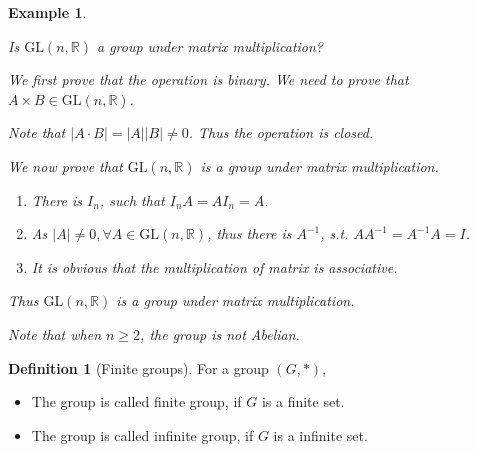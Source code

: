 \documentclass{article}
\theoremstyle{MyNonumberplain}
\theoremstyle{break}
\theoremstyle{break}
\newtheorem{example}{Example}[section]
\theoremstyle{break}
\theoremstyle{definition}
\theoremstyle{break}
\newtheorem{definition}{Definition}[section]
\begin{document}
\begin{expbox}
    \begin{example}
        \begin{example*}
            Is $\text{GL} (n, \mathbb{R})$ a group under matrix multiplication?
            \begin{ansbox}
                We first prove that the operation is binary. We need to prove that $A \times
                B \in \text{GL} (n, \mathbb{R})$.\bigskip
                
                Note that $| A \cdot B | = | A | | B | \neq 0$. Thus the operation is closed.\bigskip
                
                We now prove that $\text{GL} (n, \mathbb{R})$ is a group under matrix
                multiplication.\bigskip
                \begin{enumerate}
                  \item There is $I_n$, such that $I_n A = A I_n = A$.\bigskip
                  
                  \item As $| A | \neq 0, \forall A \in \text{GL} (n, \mathbb{R})$, thus
                  there is $A^{- 1}$, s.t. $A A^{- 1} = A^{- 1} A = I$.\bigskip
                  
                  \item It is obvious that the multiplication of matrix is associative.\bigskip
                \end{enumerate}
                Thus $\text{GL} (n, \mathbb{R})$ is a group under matrix multiplication.\bigskip
            \end{ansbox}
            Note that when $n \geq 2$, the group is not Abelian.
          \end{example*}
    \end{example}
\end{expbox}

\begin{defbox}
    \begin{definition}[Finite groups]
        For a group $(G, \ast)$,\bigskip
        \begin{itemize}
            \item The group is called finite group, if $G$ is a finite set.
            
            \item The group is called infinite group, if $G$ is a infinite set.
        \end{itemize}
    \end{definition}
\end{defbox}
\end{document}
